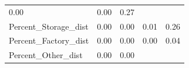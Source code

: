 \documentclass[]{article}
\begin{document}
\begin{longtable}[]{@{}lllll@{}}
\begin{minipage}[t]{0.09\columnwidth}
0.00\strut
\end{minipage} & \begin{minipage}[t]{0.09\columnwidth}\raggedright\strut
0.00\strut
\end{minipage} & \begin{minipage}[t]{0.11\columnwidth}\raggedright\strut
0.27\strut
\end{minipage}\tabularnewline
\begin{minipage}[t]{0.49\columnwidth}\raggedright\strut
Percent\_Storage\_dist\strut
\end{minipage} & \begin{minipage}[t]{0.08\columnwidth}\raggedright\strut
0.00\strut
\end{minipage} & \begin{minipage}[t]{0.09\columnwidth}\raggedright\strut
0.00\strut
\end{minipage} & \begin{minipage}[t]{0.09\columnwidth}\raggedright\strut
0.01\strut
\end{minipage} & \begin{minipage}[t]{0.11\columnwidth}\raggedright\strut
0.26\strut
\end{minipage}\tabularnewline
\begin{minipage}[t]{0.49\columnwidth}\raggedright\strut
Percent\_Factory\_dist\strut
\end{minipage} & \begin{minipage}[t]{0.08\columnwidth}\raggedright\strut
0.00\strut
\end{minipage} & \begin{minipage}[t]{0.09\columnwidth}\raggedright\strut
0.00\strut
\end{minipage} & \begin{minipage}[t]{0.09\columnwidth}\raggedright\strut
0.00\strut
\end{minipage} & \begin{minipage}[t]{0.11\columnwidth}\raggedright\strut
0.04\strut
\end{minipage}\tabularnewline
\begin{minipage}[t]{0.49\columnwidth}\raggedright\strut
Percent\_Other\_dist\strut
\end{minipage} & \begin{minipage}[t]{0.08\columnwidth}\raggedright\strut
0.00\strut
\end{minipage} & \begin{minipage}[t]{0.09\columnwidth}\raggedright\strut
0.00\strut
\end{minipage} & \begin{minipage}[t]{0.09\columnwidth}\raggedright\strut

\end{minipage}
\end{longtable}
\end{document}

